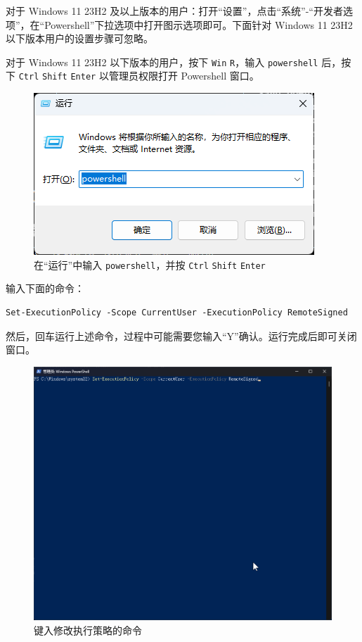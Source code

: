 对于 Windows 11 23H2 及以上版本的用户：打开“设置”，点击“系统”-“开发者选项”，在“Powershell”下拉选项中打开图示选项即可。下面针对 Windows 11 23H2 以下版本用户的设置步骤可忽略。

对于 Windows 11 23H2 以下版本的用户，按下 \lstinline{Win} \lstinline{R}，输入 \lstinline{powershell} 后，按下 \lstinline{Ctrl} \lstinline{Shift} \lstinline{Enter} 以管理员权限打开 Powershell 窗口。

\begin{figure}[H]
    \Centering
    \includegraphics[width=\textwidth]{docs/assets/run_pwsh_as_admin.png}
    \caption{在“运行”中输入 \lstinline{powershell}，并按 \lstinline{Ctrl} \lstinline{Shift} \lstinline{Enter}}
\end{figure}

输入下面的命令：

\begin{verbatim}
Set-ExecutionPolicy -Scope CurrentUser -ExecutionPolicy RemoteSigned
\end{verbatim}

然后，回车运行上述命令，过程中可能需要您输入“Y”确认。运行完成后即可关闭窗口。

\begin{figure}[H]
    \Centering
    \includegraphics[width=\textwidth]{docs/assets/confirm_execution_policy_00.png}
    \caption{键入修改执行策略的命令}
\end{figure}

